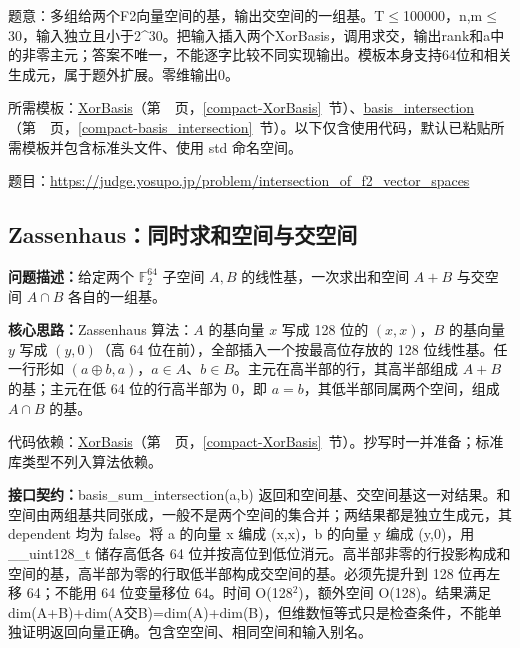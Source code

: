 \label{usage-example-178}

题意：多组给两个F2向量空间的基，输出交空间的一组基。T$\le$100000，n,m$\le$30，输入独立且小于2\textasciicircum{}30。把输入插入两个XorBasis，调用求交，输出rank和a中的非零主元；答案不唯一，不能逐字比较不同实现输出。模板本身支持64位和相关生成元，属于题外扩展。零维输出0。

所需模板：\hyperref[compact-XorBasis]{XorBasis}（第~\pageref{compact-XorBasis}~页，\ref{compact-XorBasis}~节）、\hyperref[compact-basis_intersection]{basis\_\allowbreak{}intersection}（第~\pageref{compact-basis_intersection}~页，\ref{compact-basis_intersection}~节）。以下仅含使用代码，默认已粘贴所需模板并包含标准头文件、使用 std 命名空间。

题目：\url{https://judge.yosupo.jp/problem/intersection_of_f2_vector_spaces}



\Needspace{552pt}

\subsection{Zassenhaus：同时求和空间与交空间}\label{compact-basis_sum_intersection}

\noindent\textbf{问题描述：}\allowbreak 给定两个 $\mathbb{F}_2^{64}$ 子空间 $A,B$ 的线性基，一次求出和空间 $A+B$ 与交空间 $A\cap B$ 各自的一组基。

\textbf{核心思路：}\allowbreak Zassenhaus 算法：$A$ 的基向量 $x$ 写成 128 位的 $(x,x)$，$B$ 的基向量 $y$ 写成 $(y,0)$（高 64 位在前），全部插入一个按最高位存放的 128 位线性基。任一行形如 $(a\oplus b,a)$，$a\in A$、$b\in B$。主元在高半部的行，其高半部组成 $A+B$ 的基；主元在低 64 位的行高半部为 0，即 $a=b$，其低半部同属两个空间，组成 $A\cap B$ 的基。

代码依赖：\hyperref[compact-XorBasis]{XorBasis}（第~\pageref{compact-XorBasis}~页，\ref{compact-XorBasis}~节）。抄写时一并准备；标准库类型不列入算法依赖。

{\sloppy{}\noindent\textbf{接口契约：}basis\_sum\_intersection(a,b) 返回和空间基、交空间基这一对结果。和空间由两组基共同张成，一般不是两个空间的集合并；两结果都是独立生成元，其 dependent 均为 false。将 a 的向量 x 编成 (x,x)，b 的向量 y 编成 (y,0)，用 \_\_uint128\_t 储存高低各 64 位并按高位到低位消元。高半部非零的行投影构成和空间的基，高半部为零的行取低半部构成交空间的基。必须先提升到 128 位再左移 64；不能用 64 位变量移位 64。时间 O(128$^{2}$)，额外空间 O(128)。结果满足 dim(A+B)+dim(A交B)=dim(A)+dim(B)，但维数恒等式只是检查条件，不能单独证明返回向量正确。包含空空间、相同空间和输入别名。\par}

